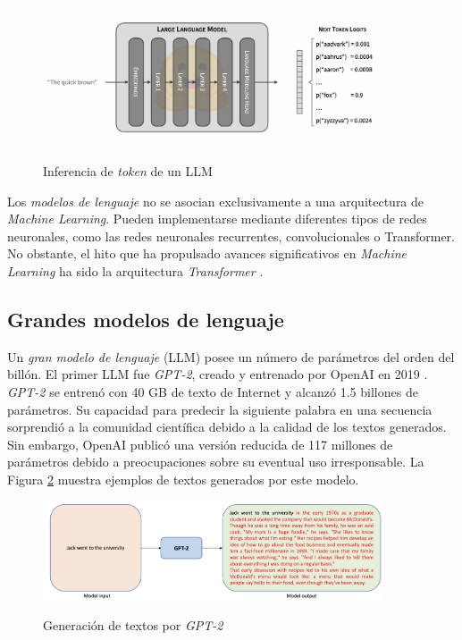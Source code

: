 \begin{figure}[h]
    \caption[Inferencia de \textit{token} de un LLM]{Inferencia de \textit{token} de un LLM}
    \centering
    \includegraphics[width=0.9\textwidth]{./figuras/LLM_predice_token.png}
    \label{fig:llm_generation}
\end{figure}

Los \textit{modelos de lenguaje} no se asocian exclusivamente a una arquitectura de \textit{Machine Learning}. Pueden implementarse mediante diferentes tipos de redes neuronales, como las redes neuronales recurrentes, convolucionales o Transformer. No obstante, el hito que ha propulsado avances significativos en \textit{Machine Learning} ha sido la arquitectura \textit{Transformer} \citep{vaswaniAttentionAllYou2017}. 

\subsection{Grandes modelos de lenguaje}

Un \textit{gran modelo de lenguaje} (LLM) posee un número de parámetros del orden del billón. El primer LLM fue \textit{GPT-2}, creado y entrenado por OpenAI en 2019 \citep{radfordLanguageModelsAre2019a}. \textit{GPT-2} se entrenó con 40 GB de texto de Internet y alcanzó 1.5 billones de parámetros. Su capacidad para predecir la siguiente palabra en una secuencia sorprendió a la comunidad científica debido a la calidad de los textos generados. Sin embargo, OpenAI publicó una versión reducida de 117 millones de parámetros debido a preocupaciones sobre su eventual uso irresponsable. La Figura \ref{fig:gpt2_text_generation} muestra ejemplos de textos generados por este modelo.

\begin{figure}[h]
    \caption{Generación de textos por \textit{GPT-2}}
    \centering
    \includegraphics[width=0.9\textwidth]{./figuras/GPT2_text_generation.png}
    \label{fig:gpt2_text_generation}
\end{figure}


